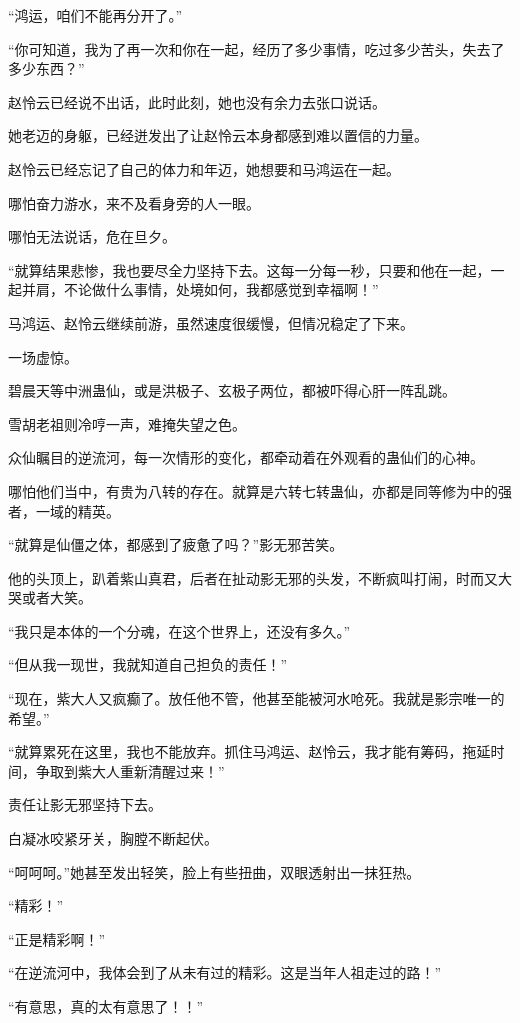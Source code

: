 \begin{this_body}
“鸿运，咱们不能再分开了。”

“你可知道，我为了再一次和你在一起，经历了多少事情，吃过多少苦头，失去了多少东西？”

赵怜云已经说不出话，此时此刻，她也没有余力去张口说话。

她老迈的身躯，已经迸发出了让赵怜云本身都感到难以置信的力量。

赵怜云已经忘记了自己的体力和年迈，她想要和马鸿运在一起。

哪怕奋力游水，来不及看身旁的人一眼。

哪怕无法说话，危在旦夕。

“就算结果悲惨，我也要尽全力坚持下去。这每一分每一秒，只要和他在一起，一起并肩，不论做什么事情，处境如何，我都感觉到幸福啊！”

马鸿运、赵怜云继续前游，虽然速度很缓慢，但情况稳定了下来。

一场虚惊。

碧晨天等中洲蛊仙，或是洪极子、玄极子两位，都被吓得心肝一阵乱跳。

雪胡老祖则冷哼一声，难掩失望之色。

众仙瞩目的逆流河，每一次情形的变化，都牵动着在外观看的蛊仙们的心神。

哪怕他们当中，有贵为八转的存在。就算是六转七转蛊仙，亦都是同等修为中的强者，一域的精英。

“就算是仙僵之体，都感到了疲惫了吗？”影无邪苦笑。

他的头顶上，趴着紫山真君，后者在扯动影无邪的头发，不断疯叫打闹，时而又大哭或者大笑。

“我只是本体的一个分魂，在这个世界上，还没有多久。”

“但从我一现世，我就知道自己担负的责任！”

“现在，紫大人又疯癫了。放任他不管，他甚至能被河水呛死。我就是影宗唯一的希望。”

“就算累死在这里，我也不能放弃。抓住马鸿运、赵怜云，我才能有筹码，拖延时间，争取到紫大人重新清醒过来！”

责任让影无邪坚持下去。

白凝冰咬紧牙关，胸膛不断起伏。

“呵呵呵。”她甚至发出轻笑，脸上有些扭曲，双眼透射出一抹狂热。

“精彩！”

“正是精彩啊！”

“在逆流河中，我体会到了从未有过的精彩。这是当年人祖走过的路！”

“有意思，真的太有意思了！！”


\end{this_body}

